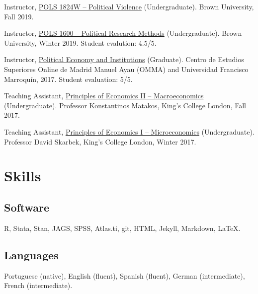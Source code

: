 \documentclass[a4paper]{article}
\renewenvironment{itemize}{
	\begin{list}{}{
			\setlength{\leftmargin}{1.5em}
		}
		}{
	\end{list}
}
\begin{document}
	\begin{itemize}
	\item Instructor, \href{http://danilofreire.github.io/pols1842w}{POLS 1824W -- Political Violence} (Undergraduate). Brown University, Fall 2019. 
	\item Instructor, \href{http://danilofreire.github.io}{POLS 1600 -- Political Research Methods} (Undergraduate). Brown University, Winter 2019. Student evalution: 4.5/5.
	\item Instructor, \href{https://github.com/danilofreire/economia-politica-instituicoes-ufm}{Political Economy and Institutions} (Graduate). Centro de Estudios Superiores Online de Madrid Manuel Ayau (OMMA) and Universidad Francisco Marroquín, 2017. Student evaluation: 5/5.
	\item Teaching Assistant, \href{https://github.com/danilofreire/core-econ}{Principles of Economics II -- Macroeconomics} (Undergraduate). Professor Konstantinos Matakos, King's College London, Fall 2017. 
	\item Teaching Assistant, \href{https://github.com/danilofreire/core-econ}{Principles of Economics I -- Microeconomics} (Undergraduate). Professor David Skarbek, King's College London, Winter 2017. 
	\end{itemize}

	\section*{Skills}

	\subsection*{Software}

	\begin{itemize}
		\item R, Stata, Stan, JAGS, SPSS, Atlas.ti, git, HTML, Jekyll, Markdown, \LaTeX{}.
	\end{itemize}

	\subsection*{Languages}

	\begin{itemize}
		\item Portuguese (native), English (fluent), Spanish (fluent), German (intermediate), French (intermediate).
	\end{itemize}
\end{document}
